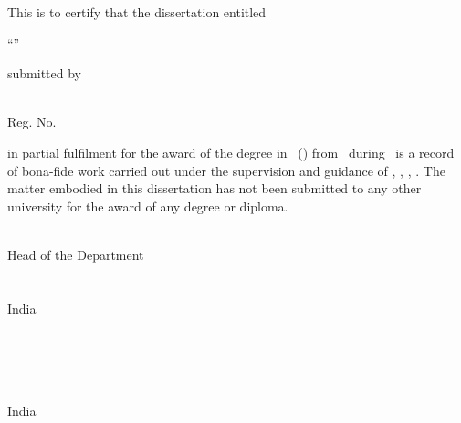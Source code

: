 \begin{certificate}
This is to certify that the  dissertation entitled
\begin{center}
``{\large \textsc{\textbf{\thesistitle}}}''

submitted by

\textbf{\large \studentname}\\
\baselineskip=18pt  Reg. No. \regno
\end{center}
     \noindent in partial fulfilment for the award of the degree in \degree\, (\coursename) from \institute\, during \courseduration\, is a record of bona-fide work carried out under the supervision and guidance of \guidename, \guidedesignation, \department, \institute. The matter embodied in this dissertation has not been submitted to any other university for the award of any degree or diploma.

\vspace*{2cm}
\noindent

\begin{minipage}[t]{0.45\textwidth}
	\baselineskip=18pt
	\centering
    \noindent {\bf \hodname }\\
    Head of the Department\\
    \department\\
    \institute\\ India
\end{minipage}
\hspace*{.1\textwidth}
 \begin{minipage}[t]{0.45\textwidth}
 	\baselineskip=18pt
 	\centering
 \noindent {\bf \guidename}\\
    \guidedesignation\\
    \department\\
    \institute\\ India
\end{minipage}
\end{certificate} 